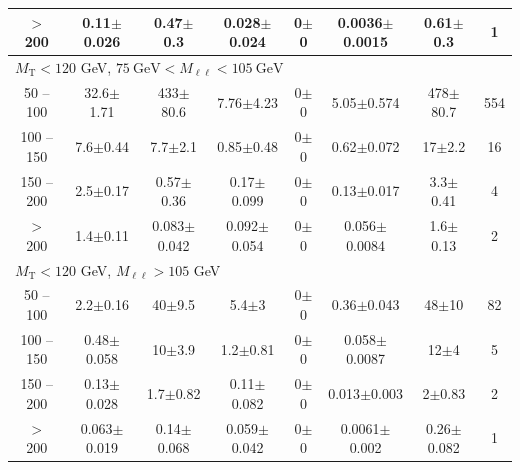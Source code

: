 \begin{table}
\begin{center}
\begin{tabular}{| c | c c c c c c c | }
$>$ 200&0.11$\pm$0.026&0.47$\pm$0.3&0.028$\pm$0.024&0$\pm$0&0.0036$\pm$0.0015&0.61$\pm$0.3&1\\
\hline\hline
\multicolumn{8}{l}{$M_{\text{T}} < 120$ GeV, $75~\mathrm{GeV} < M_{\ell\ell} < 105~\mathrm{GeV}$}\\\hline\hline
50 -- 100&32.6$\pm$1.71&433$\pm$80.6&7.76$\pm$4.23&0$\pm$0&5.05$\pm$0.574&478$\pm$80.7&554\\
100 -- 150&7.6$\pm$0.44&7.7$\pm$2.1&0.85$\pm$0.48&0$\pm$0&0.62$\pm$0.072&17$\pm$2.2&16\\
150 -- 200&2.5$\pm$0.17&0.57$\pm$0.36&0.17$\pm$0.099&0$\pm$0&0.13$\pm$0.017&3.3$\pm$0.41&4\\
$>$ 200&1.4$\pm$0.11&0.083$\pm$0.042&0.092$\pm$0.054&0$\pm$0&0.056$\pm$0.0084&1.6$\pm$0.13&2\\
\hline\hline
\multicolumn{8}{l}{$M_{\text{T}} < 120$ GeV, $M_{\ell\ell} > 105$ GeV}\\\hline\hline
50 -- 100&2.2$\pm$0.16&40$\pm$9.5&5.4$\pm$3&0$\pm$0&0.36$\pm$0.043&48$\pm$10&82\\
100 -- 150&0.48$\pm$0.058&10$\pm$3.9&1.2$\pm$0.81&0$\pm$0&0.058$\pm$0.0087&12$\pm$4&5\\
150 -- 200&0.13$\pm$0.028&1.7$\pm$0.82&0.11$\pm$0.082&0$\pm$0&0.013$\pm$0.003&2$\pm$0.83&2\\
$>$ 200&0.063$\pm$0.019&0.14$\pm$0.068&0.059$\pm$0.042&0$\pm$0&0.0061$\pm$0.002&0.26$\pm$0.082&1\\
\hline\hline
\end{tabular}
\end{center}
\end{table}
\clearpage